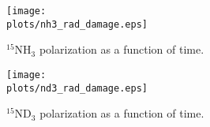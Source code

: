 \begin{figure}[h]
\centering
\texttt{[image: \\plots/nh3\_rad\_damage.eps]}
\caption{\small{$^{15}$NH$_3$ polarization as a function of time.}}
\label{raddamage-nh3}
\end{figure}

\begin{figure}[h]
\centering
\texttt{[image: \\plots/nd3\_rad\_damage.eps]}
\caption{\small{$^{15}$ND$_3$ polarization as a function of time.}}
\label {raddamage-nd3}
\end{figure}

